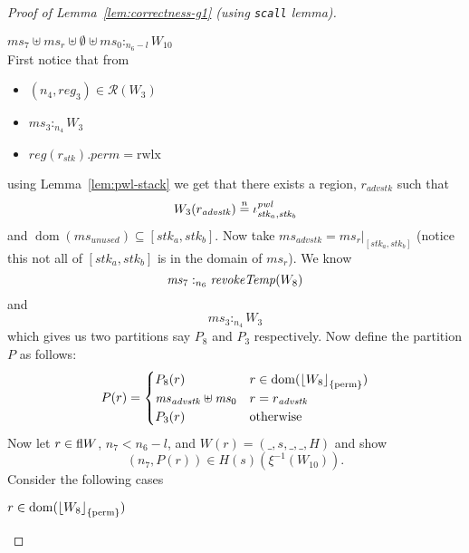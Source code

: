 \documentclass[a4paper]{article}
\DeclarePairedDelimiter\floor{\lfloor}{\rfloor}
\newcommand{\nequal}[1][n]{\stackrel{\tiny{#1}}{=}}
\DeclareMathOperator{\dom}{dom}
\newcommand{\var}[1]{\mathit{#1}}
\newcommand{\hs}{\var{ms}}
\newcommand{\ms}{\hs}
\newcommand{\reg}{\var{reg}}
\newcommand{\heap}{\var{mem}}
\newcommand{\perm}{\var{perm}}
\newcommand{\adv}{\var{adv}}
\newcommand{\stk}{\var{stk}}
\newcommand{\pwl}{\var{pwl}}
\newcommand{\unused}{\var{unused}}
\newcommand{\plainfun}[2]{
  \ifthenelse{\equal{#2}{}}
  {\mathit{#1}}
  {\mathit{#1}(#2)}
}
\newcommand{\revokeTemp}[1]{\plainfun{revokeTemp}{#1}}
\newcommand{\erase}[2]{\floor*{#1}_{\{#2\}}}
\newcommand{\heapSat}[3][\heap]{#1 :_{#2} #3}
\newcommand{\memSat}[3][n]{\heapSat[#2]{#1}{#3}}
\newcommand{\asmType}{\plaindom{AsmType}}
\newcommand{\plaindom}[1]{\mathrm{#1}}
\newcommand{\intr}[2]{\mathcal{#1}}
\newcommand{\regintr}[1]{\intr{R}{#1}}
\newcommand{\stdrr}{\regintr{\asmType}}
\newcommand{\npair}[2][n]{\left(#1,#2 \right)}
\newcommand{\plainperm}[1]{\mathrm{#1}}
\newcommand{\rwlx}{\plainperm{rwlx}}
\newcommand{\plainview}[1]{\mathrm{#1}}
\newcommand{\perma}{\plainview{perm}}
\begin{document}
\begin{proof}[Proof of Lemma~\ref{lem:correctness-g1} (using \texttt{scall} lemma)]
\begin{enumproof}[resume]
\begin{enumproof}
\begin{enumproof}
            \item $\memSat[n_6-l]{\ms_7 \uplus \ms_r \uplus \emptyset \uplus \ms_0}{W_{10}}$ \label{g1:memsatw10}\\
              First notice that from %
              \begin{itemize}
              \item $\npair[n_4]{\reg_3} \in \stdrr(W_3)$
              \item $\memSat[n_4]{\ms_3}{W_3}$
              \item $\reg(r_\stk).\perm = \rwlx$
              \end{itemize}
              using Lemma~\ref{lem:pwl-stack} we get that there exists a region, $r_{\adv \stk}$ such that
              \[
                W_3(r_{\adv \stk}) \nequal \iota_{\stk_a,\stk_b}^\pwl
              \]
              and $\dom(\ms_\unused) \subseteq [\stk_a,\stk_b]$. Now take $\ms_{\adv \stk} = \ms_r|_{[\stk_a,\stk_b]}$ (notice this not all of $[\stk_a,\stk_b]$ is in the domain of $\ms_r$).
              We know
              \begin{equation}
                \label{eq:g1:ms7heapsat}
                \memSat[n_6]{\ms_7}{\revokeTemp{W_8}}
              \end{equation}
              and
              \begin{equation}
                \label{eq:g1:ms3heapsat}
                \memSat[n_4]{\ms_3}{W_3}
              \end{equation}
              which gives us two partitions say $P_8$ and $P_3$ respectively. Now define the partition $P$ as follows:
              \[
                P(r) =
                \begin{cases}
                  P_8(r) & r \in \dom(\erase{W_8}{\perma}) \\
                  \ms_{\adv \stk} \uplus \ms_0 & r = r_{\adv \stk}\\
                  P_3(r) & \text{otherwise}
                \end{cases}
              \]
              Now let $r \in \active{W}$, $n_7 < n_6 - l$, and $W(r) = (\_,s,\_,\_,H)$ and show
              \[
                \npair[n_7]{P(r)} \in H(s)(\xi^{-1}(W_{10})).
              \]
              Consider the following cases
              \begin{enumproof}
                \item $r \in \dom(\erase{W_8}{\perma})$ \\

\end{enumproof}
\end{enumproof}
\end{enumproof}
\end{enumproof}
\end{proof}
\end{document}
